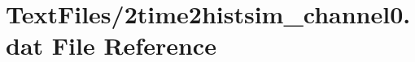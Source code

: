 \hypertarget{2time2histsim__channel0_8dat}{}\section{Text\+Files/2time2histsim\+\_\+channel0.dat File Reference}
\label{2time2histsim__channel0_8dat}
